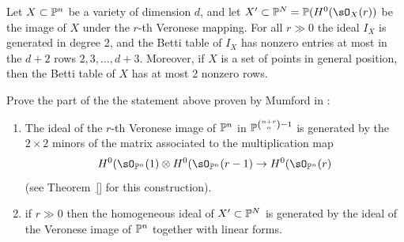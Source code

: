 \begin{fact}
 Let $X\subset \PP^{n}$ be a variety of dimension $d$, and let $X'\subset \PP^{N} = \PP(H^{0}(\sO_{X}(r))$ be the image of
 $X$ under the $r$-th Veronese mapping. For all $r\gg 0$ the ideal $I_X$ is generated in degree 2,
 and the Betti table of $I_{X}$ has nonzero entries at most in the $d+2$ rows $2,3,\dots,d+3$. Moreover, if 
 $X$ is a set of points in general position, then the Betti table of $X$ has at most 2 nonzero rows.
\end{fact}

\begin{exercise}
Prove the part of the the statement above proven by Mumford in \cite{quadrics}:
\begin{enumerate}

 \item The ideal of the $r$-th Veronese image of $\PP^{n}$  in $\PP^{{n+r\choose n}-1}$
 is generated by the $2\times 2$ minors 
 of the matrix associated to the multiplication map 
 $$
 H^{0}(\sO_{\PP^{n}}(1) \otimes H^{0}(\sO_{\PP^{n}}(r-1) \to  H^{0}(\sO_{\PP^{n}}(r)
 $$
 (see Theorem~\ref{} %
 for this construction).
 
 \item  if $r\gg 0$ then the homogeneous ideal of $X'\subset \PP^{N}$ is generated by the
 ideal of the Veronese image of $\PP^{n}$ together with linear forms.
\end{enumerate}
\end{exercise}


